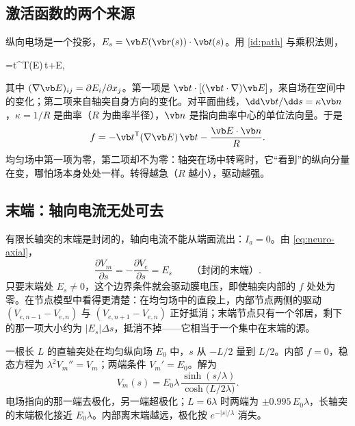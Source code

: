 \subsection{激活函数的两个来源}
纵向电场是一个投影，$E_s=\vb E(\vb r(s))\cdot\vb t(s)$。用 \eqref{id:path} 与乘积法则，
\begin{keyeq}
=\vb t^{\mathsf T}(\nabla\vb E)\,\vb t+\vb E\cdot{},
\label{eq:curvatureAF}
\end{keyeq}
其中 $(\nabla\vb E)_{ij}=\partial E_i/\partial x_j$。第一项是 $\vb t\cdot[(\vb t\cdot\nabla)\vb E]$，来自场在空间中的变化；第二项来自轴突自身方向的变化。对平面曲线，$\dd\vb t/\dd s=\kappa\vb n$，$\kappa=1/R$ 是曲率（$R$ 为曲率半径），$\vb n$ 是指向曲率中心的单位法向量。于是
\begin{equation}
f=-\vb t^{\mathsf T}(\nabla\vb E)\,\vb t-\frac{\vb E\cdot\vb n}{R}.
\label{eq:neuro-curvature}
\end{equation}
均匀场中第一项为零，第二项却不为零：轴突在场中转弯时，它“看到”的纵向分量在变，哪怕场本身处处一样。转得越急（$R$ 越小），驱动越强。

\subsection{末端：轴向电流无处可去}
有限长轴突的末端是封闭的，轴向电流不能从端面流出：$I_a=0$。由 \eqref{eq:neuro-axial}，
\begin{equation}
\frac{\partial V_m}{\partial s}=-\frac{\partial V_e}{\partial s}=E_s\qquad\text{（封闭的末端）}.
\label{eq:neuro-endbc}
\end{equation}
只要末端处 $E_s\ne0$，这个边界条件就会驱动膜电压，即使轴突内部的 $f$ 处处为零。在节点模型中看得更清楚：在均匀场中的直段上，内部节点两侧的驱动 $(V_{e,n-1}-V_{e,n})$ 与 $(V_{e,n+1}-V_{e,n})$ 正好抵消；末端节点只有一个邻居，剩下的那一项大小约为 $|E_s|\Delta s$，抵消不掉——它相当于一个集中在末端的源。

一根长 $L$ 的直轴突处在均匀纵向场 $E_0$ 中，$s$ 从 $-L/2$ 量到 $L/2$。内部 $f=0$，稳态方程为 $\lambda^2V_m''=V_m$；两端条件 $V_m'=E_0$。解为
\begin{equation}
V_m(s)=E_0\lambda\,\frac{\sinh(s/\lambda)}{\cosh\bigl(L/2\lambda\bigr)} .
\end{equation}
电场指向的那一端去极化，另一端超极化；$L=6\lambda$ 时两端为 $\pm0.995\,E_0\lambda$，长轴突的末端极化接近 $E_0\lambda$。内部离末端越远，极化按 $e^{-|s|/\lambda}$ 消失。

